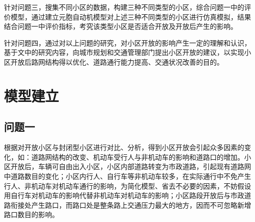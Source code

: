\documentclass[fontset=fandol,a4paper,12pt]{ctexart}
\begin{document}
	针对问题三，搜集不同小区的数据，构建三种不同类型的小区，综合问题一中的评价模型，通过建立元胞自动机模型对上述三种不同类型的小区进行仿真模拟，结果结合问题一中评价指标，考究该类型小区是否适合开放及开放后产生的影响。
	
	针对问题四，通过对以上问题的研究，对小区开放的影响产生一定的理解和认识，基于文中的研究内容，向城市规划和交通管理部门提出小区开放的建议，以实现小区开放后路网结构得以优化、道路通行能力提高、交通状况改善的目的。
  \section{模型建立}
	  
	\subsection{问题一}
		根据对开放小区与封闭型小区进行对比、分析，得到小区开放会引起众多因素的变化，如：道路网结构的改变、机动车受行人与非机动车的影响和道路口的增加。小区开放后，车辆可自由出入小区，小区内部道路转变为市政道路，引起现有道路网中道路数目的变化；小区内行人、自行车等非机动车较多，在实际通行中不免产生行人、非机动车对机动车通行的影响，为简化模型、省去不必要的因素，不妨假设用自行车对机动车的影响代替非机动车对机动车的影响；小区路段开放后与市政道路衔接处产生路口，而路口处是整条路上交通压力最大的地方，因而不可忽略新增路口数目的影响。

		
\end{document}
